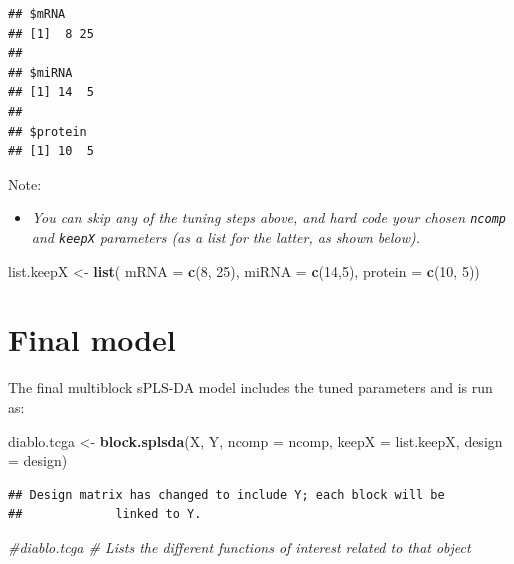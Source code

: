 \documentclass[]{book}
\newenvironment{Shaded}{\begin{snugshade}}{\end{snugshade}}
\newcommand{\KeywordTok}[1]{\textcolor[rgb]{0.13,0.29,0.53}{\textbf{#1}}}
\newcommand{\DataTypeTok}[1]{\textcolor[rgb]{0.13,0.29,0.53}{#1}}
\newcommand{\DecValTok}[1]{\textcolor[rgb]{0.00,0.00,0.81}{#1}}
\newcommand{\StringTok}[1]{\textcolor[rgb]{0.31,0.60,0.02}{#1}}
\newcommand{\CommentTok}[1]{\textcolor[rgb]{0.56,0.35,0.01}{\textit{#1}}}
\newcommand{\NormalTok}[1]{#1}
\providecommand{\tightlist}{%
  \setlength{\itemsep}{0pt}\setlength{\parskip}{0pt}}
\begin{document}
\begin{verbatim}
## $mRNA
## [1]  8 25
## 
## $miRNA
## [1] 14  5
## 
## $protein
## [1] 10  5
\end{verbatim}

Note:

\begin{itemize}
\tightlist
\item
  \emph{You can skip any of the tuning steps above, and hard code your
  chosen \texttt{ncomp} and \texttt{keepX} parameters (as a list for the
  latter, as shown below).}
\end{itemize}

\begin{Shaded}
\begin{Highlighting}[]
\NormalTok{list.keepX <-}\StringTok{ }\KeywordTok{list}\NormalTok{( }\DataTypeTok{mRNA =} \KeywordTok{c}\NormalTok{(}\DecValTok{8}\NormalTok{, }\DecValTok{25}\NormalTok{), }\DataTypeTok{miRNA =} \KeywordTok{c}\NormalTok{(}\DecValTok{14}\NormalTok{,}\DecValTok{5}\NormalTok{), }\DataTypeTok{protein =} \KeywordTok{c}\NormalTok{(}\DecValTok{10}\NormalTok{, }\DecValTok{5}\NormalTok{))}
\end{Highlighting}
\end{Shaded}

\section{Final model}\label{final-model}

The final multiblock sPLS-DA model includes the tuned parameters and is
run as:

\begin{Shaded}
\begin{Highlighting}[]
\NormalTok{diablo.tcga <-}\StringTok{ }\KeywordTok{block.splsda}\NormalTok{(X, Y, }\DataTypeTok{ncomp =}\NormalTok{ ncomp, }
                            \DataTypeTok{keepX =}\NormalTok{ list.keepX, }\DataTypeTok{design =}\NormalTok{ design)}
\end{Highlighting}
\end{Shaded}

\begin{verbatim}
## Design matrix has changed to include Y; each block will be
##             linked to Y.
\end{verbatim}

\begin{Shaded}
\begin{Highlighting}[]
\CommentTok{#diablo.tcga   # Lists the different functions of interest related to that object}
\end{Highlighting}
\end{Shaded}
\end{document}
